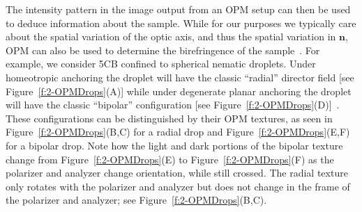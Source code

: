 The intensity pattern in the image output from an OPM setup can then be used to deduce information about the sample.
While for our purposes we typically care about the spatial variation of the optic axis, and thus the spatial variation in $\mathbf{n}$, OPM can also be used to determine the birefringence of the sample~\cite{RN232}.
For example, we consider 5CB confined to spherical nematic droplets.
Under homeotropic anchoring the droplet will have the classic ``radial'' director field [see Figure~\ref{f:2-OPMDrops}(A)] while under degenerate planar anchoring the droplet will have the classic ``bipolar'' configuration [see Figure~\ref{f:2-OPMDrops}(D)]~\cite{RN177}.
These configurations can be distinguished by their OPM textures, as seen in Figure~\ref{f:2-OPMDrops}(B,C) for a radial drop and Figure~\ref{f:2-OPMDrops}(E,F) for a bipolar drop.
Note how the light and dark portions of the bipolar texture change from Figure~\ref{f:2-OPMDrops}(E) to Figure~\ref{f:2-OPMDrops}(F) as the polarizer and analyzer change orientation, while still crossed.
The radial texture only rotates with the polarizer and analyzer but does not change in the frame of the polarizer and analyzer; see Figure~\ref{f:2-OPMDrops}(B,C).

